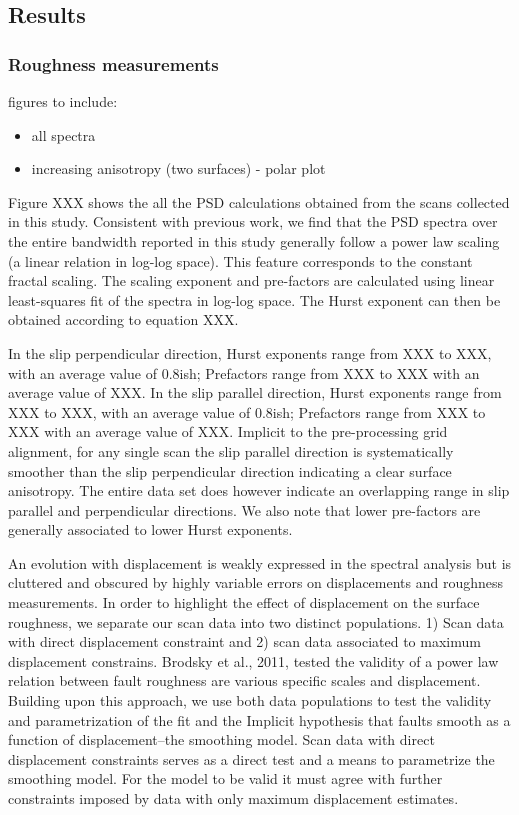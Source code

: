 \documentclass[12pt,a4paper]{article}
\begin{document}
\subsection{Results}

	
\subsubsection{Roughness measurements}

figures to include:
\begin{itemize}
\item all spectra
\item increasing anisotropy (two surfaces) - polar plot

\end{itemize}

Figure XXX shows the all the PSD calculations obtained from the scans collected in this study. Consistent with previous work, we find that the PSD spectra over the entire bandwidth reported in this study generally follow a power law scaling (a linear relation in log-log space). This feature corresponds to the constant fractal scaling. The scaling exponent and pre-factors are calculated using linear least-squares fit of the spectra in log-log space. The Hurst exponent can then be obtained according to equation XXX.

In the slip perpendicular direction, Hurst exponents range from XXX to XXX, with an average value of 0.8ish; Prefactors range from  XXX to XXX with an average value of XXX. In the slip parallel direction, Hurst exponents range from XXX to XXX, with an average value of 0.8ish; Prefactors range from  XXX to XXX with an average value of XXX. Implicit to the pre-processing grid alignment, for any single scan the slip parallel direction is systematically smoother than the slip perpendicular direction indicating a clear surface anisotropy. The entire data set does however indicate an overlapping range in slip parallel and perpendicular directions. We also note that lower pre-factors are generally associated to lower Hurst exponents.

An evolution with displacement is weakly expressed in the spectral analysis but is cluttered and obscured by highly variable errors on displacements and roughness measurements. In order to highlight the effect of displacement on the surface roughness, we separate our scan data into two distinct populations. 1) Scan data with direct displacement constraint and 2) scan data associated to maximum displacement constrains.  Brodsky et al., 2011, tested the validity of a power law relation between fault roughness are various specific scales and displacement. Building upon this approach, we use both data populations to test the validity and parametrization of the fit and the Implicit hypothesis that faults smooth as a function of displacement--the smoothing model. Scan data with direct displacement constraints serves as a direct test and a means to parametrize the smoothing model. For the model to be valid it must agree with further constraints imposed by data with only maximum displacement estimates.
\end{document}
